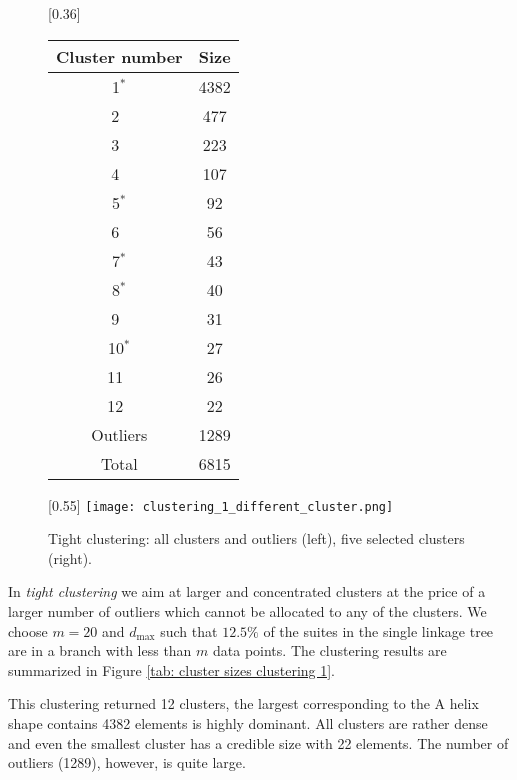 \documentclass{llncs}
\begin{document}
\begin{figure}[ht!]
        \centering
        [0.36\textwidth]{
        \begin{tabular}{c|c}
            Cluster number & Size\\ %
            \hline
            1$^*$ &  4382 \\
            2~ & 477 \\
            3~ & 223 \\
            4~ & 107 \\
            5$^*$ & 92 \\
            6~ & 56 \\
            7$^*$ & 43 \\
            8$^*$ & 40 \\
            9~ & 31 \\
            10$^*$ & 27 \\
            11~ & 26 \\
            12~ & 22 \\
            Outliers & 1289\\
            \hline
            Total & 6815
        \end{tabular}
        }
    \hspace*{0.02\textwidth}
     [0.55\textwidth]{
        \texttt{[image: clustering\_1\_different\_cluster.png]}
    }
    \caption{Tight clustering: all clusters and outliers (left), five selected clusters (right). \label{fig:tight-clust}}
\end{figure}

In  \emph{tight clustering} we aim at larger and concentrated clusters at the price of a larger number of outliers which cannot be allocated to any of the clusters. We choose $m=20$ and $d_{\text{max}}$ such that $12.5\%$ of the suites in the single linkage tree are in a branch with less than $m$ data points. %
The clustering results are summarized in 
Figure \ref{tab: cluster sizes clustering 1}.

This clustering returned 12 clusters, the largest corresponding to the A helix shape contains 4382 elements is highly dominant. All clusters are rather dense and even the smallest cluster has a credible size with 22 elements. The number of outliers (1289), however, is quite large.
\end{document}
